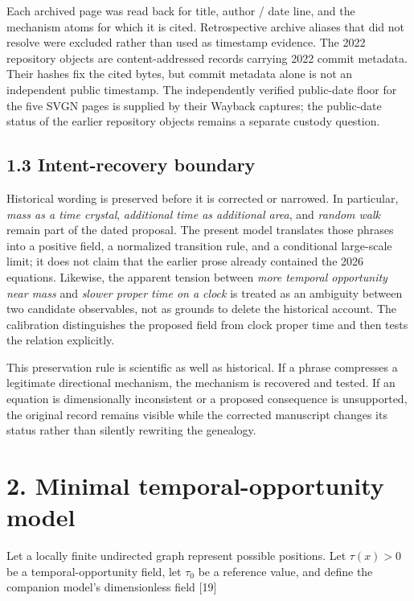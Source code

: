 \documentclass[
  american,
  11pt,
  letterpaper,
]{article}
\begin{document}
Each archived page was read back for title, author / date line, and the mechanism atoms for which it is cited. Retrospective archive aliases that did not resolve were excluded rather than used as timestamp evidence. The 2022 repository objects are content-addressed records carrying 2022 commit metadata. Their hashes fix the cited bytes, but commit metadata alone is not an independent public timestamp. The independently verified public-date floor for the five SVGN pages is supplied by their Wayback captures; the public-date status of the earlier repository objects remains a separate custody question.

\subsection{1.3 Intent-recovery boundary}\label{intent-recovery-boundary}

Historical wording is preserved before it is corrected or narrowed. In particular, \emph{mass as a time crystal}, \emph{additional time as additional area}, and \emph{random walk} remain part of the dated proposal. The present model translates those phrases into a positive field, a normalized transition rule, and a conditional large-scale limit; it does not claim that the earlier prose already contained the 2026 equations. Likewise, the apparent tension between \emph{more temporal opportunity near mass} and \emph{slower proper time on a clock} is treated as an ambiguity between two candidate observables, not as grounds to delete the historical account. The calibration distinguishes the proposed field from clock proper time and then tests the relation explicitly.

This preservation rule is scientific as well as historical. If a phrase compresses a legitimate directional mechanism, the mechanism is recovered and tested. If an equation is dimensionally inconsistent or a proposed consequence is unsupported, the original record remains visible while the corrected manuscript changes its status rather than silently rewriting the genealogy.

\section{2. Minimal temporal-opportunity model}\label{minimal-temporal-opportunity-model}

Let a locally finite undirected graph represent possible positions. Let \(\tau(x)>0\) be a temporal-opportunity field, let \(\tau_0\) be a reference value, and define the companion model's dimensionless field {[}19{]}
\end{document}

